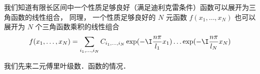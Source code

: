 

我们知道有限长区间中一个性质足够良好（满足迪利克雷条件）函数可以展开为三角函数的线性组合， 同理， 一个性质足够良好的 $N$ 元函数 $f(x_1, \dots, x_N)$ 也可以展开为 $N$ 个三角函数乘积的线性组合
\begin{equation}
f(x_1, \dots, x_N) = \sum_{i_1,\dots, i_N} C_{i_1,\dots, i_N} \exp(-\I \frac{n\pi}{l_1} x_1) \dots \exp(-\I \frac{n\pi}{l_N} x_N)
\end{equation}

我们先来二元傅里叶级数．函数的情况．
